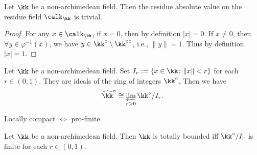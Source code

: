     \begin{proposition}\label{prop:residue_absolute_value_on_residue_fields_is_trivial}
        Let \(\kk\) be a non-archimedean field.
        Then the residue absolute value on the residue field \(\calk_\kk\) is trivial.
    \end{proposition}
    \begin{proof}
        For any \(x \in \calk_\kk\), if \(x = 0\), then by definition \(|x| = 0\).
        If \(x \neq 0\), then \(\forall y \in \varphi^{-1}(x)\), we have \(y \in \kk^\circ \setminus \kk^{\circ\circ}\), i.e., \(\|y\| = 1\).
        Thus by definition \(|x| = 1\).
    \end{proof}



    \begin{proposition}\label{prop:recover_complete_non-archimedean_fields_from_projective_limits}
        Let \(\kk\) be a non-archimedean field.
        Set \(I_r := \{x \in \kk\colon \|x\| < r\}\) for each \(r \in (0,1)\).
        They are ideals of the ring of integers \(\kk^\circ\).
        Then we have 
        \[ \widehat{\kk}^\circ \cong \varprojlim_{r > 0} \kk^\circ / I_r. \]
    \end{proposition}

    \begin{slogan}
        Locally compact \(\iff\) pro-finite.
    \end{slogan}

    \begin{proposition}\label{prop:locally_compact_NA_field_iff_it_is_pro-finite}
        Let \(\kk\) be a non-archimedean field.
        Then \(\kk\) is totally bounded iff \(\kk^\circ / I_r\) is finite for each \(r \in (0,1)\).
    \end{proposition}


